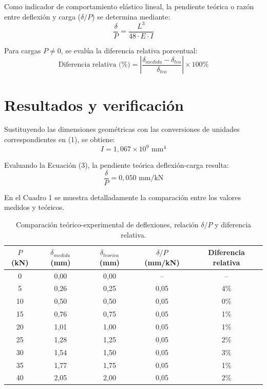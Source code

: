 Como indicador de comportamiento elástico lineal, la pendiente teórica o razón entre deflexión y carga ($\delta/P$) se determina mediante:
\begin{equation}
\frac{\delta}{P} = \frac{L^3}{48 \cdot E \cdot I}
\label{eq:flexibilidad}
\end{equation}

Para cargas $P \neq 0$, se evalúa la diferencia relativa porcentual:
\begin{equation}
\text{Diferencia relativa (\%)} = \left| \frac{\delta_{medida} - \delta_{teo}}{\delta_{teo}} \right| \times 100\%
\label{eq:diferencia}
\end{equation}

\section{Resultados y verificación}

Sustituyendo las dimensiones geométricas con las conversiones de unidades correspondientes en (1), se obtiene:
\[
I = 1{,}067 \times 10^9\text{ mm}^4
\]

Evaluando la Ecuación (3), la pendiente teórica deflexión-carga resulta:
\[
\frac{\delta}{P}  = 0{,}050\text{ mm/kN}
\]

En el Cuadro 1  se muestra detalladamente la comparación entre los valores medidos y teóricos.


\begin{table}[htbp]
    \centering
    \caption{Comparación teórico-experimental de deflexiones, relación $\delta/P$ y diferencia relativa.}
    \label{tab:resultados}
    \vspace{0.2cm}
    \begin{tabular}{ccccc}
        \toprule
        $P$ (kN) & $\delta_{medida}$ (mm) & $\delta_{teorica}$ (mm) & $\delta/P$ (mm/kN) & Diferencia relativa \\
        \midrule
       0  & 0,00 & 0,00 & --    & -- \\
        5  & 0,26 & 0,25 & 0,05 & 4\% \\
        10 & 0,50 & 0,50 & 0,05 & 0\% \\
        15 & 0,76 & 0,75 & 0,05 & 1\% \\
        20 & 1,01 & 1,00 & 0,05 & 1\% \\
        25 & 1,28 & 1,25 & 0,05 & 2\% \\
        30 & 1,54 & 1,50 & 0,05 & 3\% \\
        35 & 1,77 & 1,75 & 0,05 & 1\% \\
        40 & 2,05 & 2,00 & 0,05 & 2\% \\
        \bottomrule
    \end{tabular}
\end{table}

